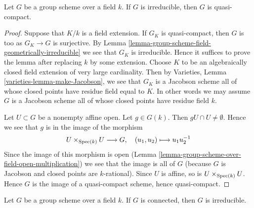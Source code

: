 \begin{lemma}
\label{lemma-irreducible-group-scheme-over-field-qc}
Let $G$ be a group scheme over a field $k$. If $G$ is irreducible,
then $G$ is quasi-compact.
\end{lemma}

\begin{proof}
Suppose that $K/k$ is a field extension. If $G_K$
is quasi-compact, then $G$ is too as $G_K \to G$ is surjective.
By Lemma \ref{lemma-group-scheme-field-geometrically-irreducible}
we see that $G_K$ is irreducible. Hence it suffices to prove the lemma
after replacing $k$ by some extension. Choose $K$ to be an algebraically
closed field extension of very large cardinality. Then by
Varieties, Lemma \ref{varieties-lemma-make-Jacobson},
we see that $G_K$ is a Jacobson scheme all of whose closed points have residue
field equal to $K$. In other words we may assume $G$ is a Jacobson
scheme all of whose closed points have residue field $k$.

\medskip\noindent
Let $U \subset G$ be a nonempty affine open. Let $g \in G(k)$. Then
$gU \cap U \not = \emptyset$. Hence we see that $g$ is in the image
of the morphism
$$
U \times_{\mathop{\mathrm{Spec}}(k)} U \longrightarrow G, \quad
(u_1, u_2) \longmapsto u_1u_2^{-1}
$$
Since the image of this morphism is open
(Lemma \ref{lemma-group-scheme-over-field-open-multiplication})
we see that the image is all of $G$ (because $G$ is Jacobson
and closed points are $k$-rational).
Since $U$ is affine, so is $U \times_{\mathop{\mathrm{Spec}}(k)} U$. Hence $G$ is the
image of a quasi-compact scheme, hence quasi-compact.
\end{proof}

\begin{lemma}
\label{lemma-connected-group-scheme-over-field-irreducible}
Let $G$ be a group scheme over a field $k$. If $G$ is connected,
then $G$ is irreducible.
\end{lemma}

